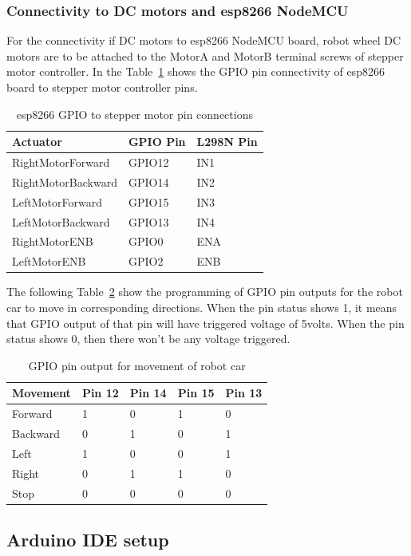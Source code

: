 \subsubsection{Connectivity to DC motors and esp8266 NodeMCU}
For the connectivity if DC motors to esp8266 NodeMCU board, robot wheel 
DC motors are to be attached to the MotorA and MotorB terminal screws 
of stepper motor controller. In the Table~\ref{T:pinlayout} shows the 
GPIO pin connectivity of esp8266 board to stepper motor controller pins.

\begin{table}[htb]
\caption{esp8266 GPIO to stepper motor pin connections}\label{T:pinlayout}
\begin{tabular}{lll}
Actuator & GPIO Pin & L298N Pin \\
\hline
    RightMotorForward & GPIO12 & IN1 \\
    RightMotorBackward & GPIO14 & IN2 \\
    LeftMotorForward & GPIO15 & IN3 \\
    LeftMotorBackward & GPIO13 & IN4 \\
    RightMotorENB & GPIO0 & ENA \\
    LeftMotorENB & GPIO2 & ENB \\
\end{tabular}
\end{table}

The following Table~\ref{T:gpiooutput} show the programming of GPIO pin 
outputs for the robot car to move in corresponding directions. When the pin 
status shows 1, it means that GPIO output of that pin will have triggered 
voltage of 5volts. When the pin status shows 0, then there won't be any 
voltage triggered.

\begin{table}[htb]
\caption{GPIO pin output for movement of robot car}\label{T:gpiooutput}
\begin{tabular}{lllll}
Movement & Pin 12 & Pin 14 & Pin 15 & Pin 13 \\
\hline
Forward & 1 & 0 & 1 & 0 \\ 
Backward & 0 & 1 & 0 & 1 \\
Left & 1 & 0 & 0 & 1 \\
Right & 0 & 1 & 1 & 0 \\
Stop  & 0 & 0 & 0 & 0 \\
\end{tabular}
\end{table}

\subsection{Arduino IDE setup}
